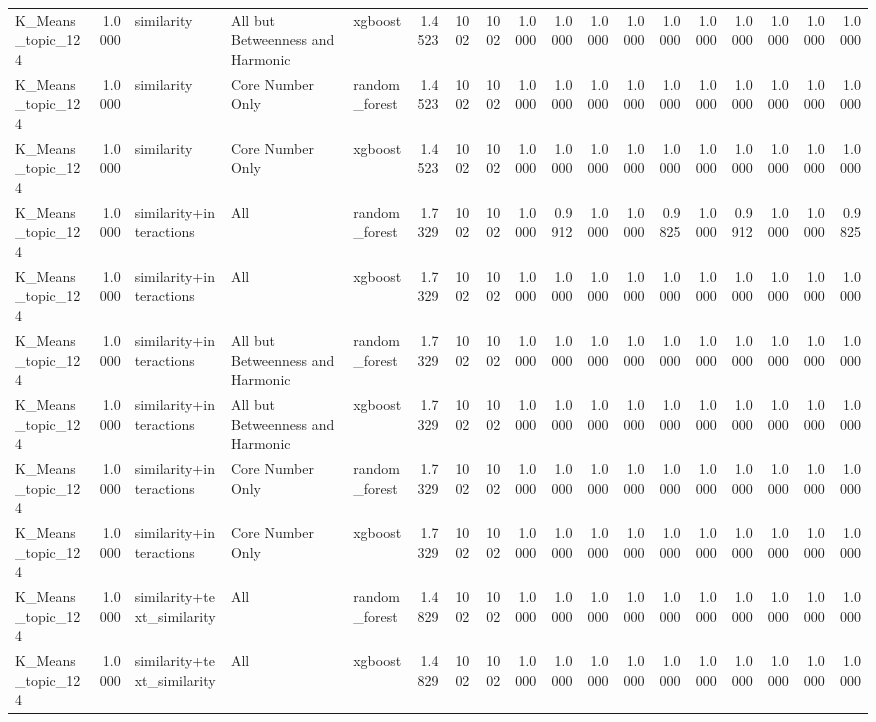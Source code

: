 \begin{tabular}{lrlllrrrrrrrrrrrrr}
K_Means_topic_124 & 1.0000 & similarity & All but Betweenness and Harmonic & xgboost & 1.4523 & 1002 & 1002 & 1.0000 & 1.0000 & 1.0000 & 1.0000 & 1.0000 & 1.0000 & 1.0000 & 1.0000 & 1.0000 & 1.0000 \\
K_Means_topic_124 & 1.0000 & similarity & Core Number Only & random_forest & 1.4523 & 1002 & 1002 & 1.0000 & 1.0000 & 1.0000 & 1.0000 & 1.0000 & 1.0000 & 1.0000 & 1.0000 & 1.0000 & 1.0000 \\
K_Means_topic_124 & 1.0000 & similarity & Core Number Only & xgboost & 1.4523 & 1002 & 1002 & 1.0000 & 1.0000 & 1.0000 & 1.0000 & 1.0000 & 1.0000 & 1.0000 & 1.0000 & 1.0000 & 1.0000 \\
K_Means_topic_124 & 1.0000 & similarity+interactions & All & random_forest & 1.7329 & 1002 & 1002 & 1.0000 & 0.9912 & 1.0000 & 1.0000 & 0.9825 & 1.0000 & 0.9912 & 1.0000 & 1.0000 & 0.9825 \\
K_Means_topic_124 & 1.0000 & similarity+interactions & All & xgboost & 1.7329 & 1002 & 1002 & 1.0000 & 1.0000 & 1.0000 & 1.0000 & 1.0000 & 1.0000 & 1.0000 & 1.0000 & 1.0000 & 1.0000 \\
K_Means_topic_124 & 1.0000 & similarity+interactions & All but Betweenness and Harmonic & random_forest & 1.7329 & 1002 & 1002 & 1.0000 & 1.0000 & 1.0000 & 1.0000 & 1.0000 & 1.0000 & 1.0000 & 1.0000 & 1.0000 & 1.0000 \\
K_Means_topic_124 & 1.0000 & similarity+interactions & All but Betweenness and Harmonic & xgboost & 1.7329 & 1002 & 1002 & 1.0000 & 1.0000 & 1.0000 & 1.0000 & 1.0000 & 1.0000 & 1.0000 & 1.0000 & 1.0000 & 1.0000 \\
K_Means_topic_124 & 1.0000 & similarity+interactions & Core Number Only & random_forest & 1.7329 & 1002 & 1002 & 1.0000 & 1.0000 & 1.0000 & 1.0000 & 1.0000 & 1.0000 & 1.0000 & 1.0000 & 1.0000 & 1.0000 \\
K_Means_topic_124 & 1.0000 & similarity+interactions & Core Number Only & xgboost & 1.7329 & 1002 & 1002 & 1.0000 & 1.0000 & 1.0000 & 1.0000 & 1.0000 & 1.0000 & 1.0000 & 1.0000 & 1.0000 & 1.0000 \\
K_Means_topic_124 & 1.0000 & similarity+text_similarity & All & random_forest & 1.4829 & 1002 & 1002 & 1.0000 & 1.0000 & 1.0000 & 1.0000 & 1.0000 & 1.0000 & 1.0000 & 1.0000 & 1.0000 & 1.0000 \\
K_Means_topic_124 & 1.0000 & similarity+text_similarity & All & xgboost & 1.4829 & 1002 & 1002 & 1.0000 & 1.0000 & 1.0000 & 1.0000 & 1.0000 & 1.0000 & 1.0000 & 1.0000 & 1.0000 & 1.0000 \\

\end{tabular}
